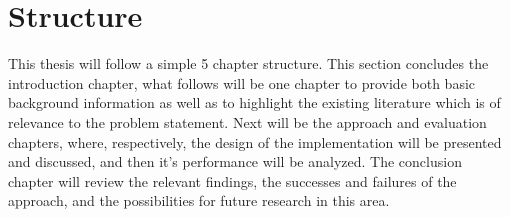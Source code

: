 \section{Structure}

This thesis will follow a simple 5 chapter structure. This section concludes the introduction chapter, what follows will be one chapter to provide both basic background information as well as to highlight the existing literature which is of relevance to the problem statement. Next will be the approach and evaluation chapters, where, respectively, the design of the implementation will be presented and discussed, and then it's performance will be analyzed. The conclusion chapter will review the relevant findings, the successes and failures of the approach, and the possibilities for future research in this area.








\nocite{tsai2006review}
\nocite{tao2005improving}
\nocite{kundel2022user}
\nocite{goldenberg2004optimizing}
\nocite{lange2015performance}
\nocite{tarique2009survey}
\nocite{tschoke2021time}
\nocite{ganichev2010yamr}
\nocite{habib2007improving}
\nocite{guo2004experiences}
\nocite{akella2003measurement}
\nocite{ergencc2021reliability}
\nocite{tao2004application}
\nocite{alwan2010multi}
\nocite{prados2021asynchronous}
\nocite{zhang2016fundamentals}
\nocite{chen2020collaborative}
\nocite{akella2008performance}
\nocite{andreoli2017mobile}
\nocite{huang2008multiconstrained}
\nocite{capela2014multihoming}
\nocite{sheyibani2012reliable}
\nocite{nguyen2003path}
\nocite{tao2004exploring}
\nocite{bremler2002predicting}
\nocite{zand2012wireless}
\nocite{li2016multipath}
\nocite{finn2019deterministic}
\nocite{finn2019deterministicArch}
\nocite{jaber20165g}
\nocite{xiong2006lightweight}
\nocite{apostolaki2021performance}
\nocite{chebrolu2006bandwidth}
\nocite{stoica1997hierarchical}
\nocite{hoiland2018piece}
\nocite{huang2007wimp}
\nocite{artiga2016terrestrial}
\nocite{rodriguez2004mar}
\nocite{deutschmann2022broadband}
\nocite{murmurhash3}

